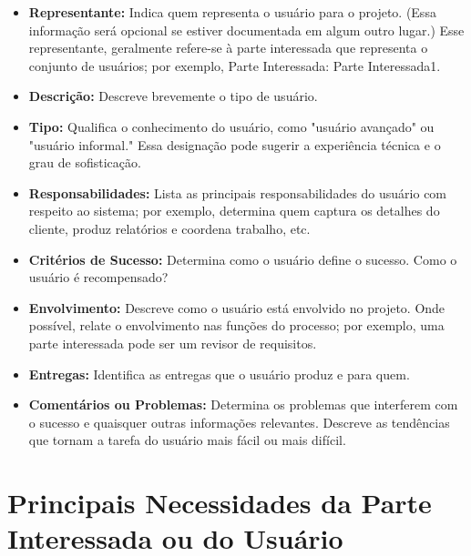 \documentclass{report}
\begin{document}
\begin{itemize}

	\item
	      \textbf{Representante:} Indica quem representa o usuário para o projeto. (Essa
	      informação será opcional se estiver documentada em algum outro lugar.) Esse
	      representante, geralmente refere-se à parte interessada que representa o
	      conjunto de usuários; por exemplo, Parte Interessada: Parte Interessada1.

	\item
	      \textbf{Descrição:} Descreve brevemente o tipo de usuário.

	\item
	      \textbf{Tipo:} Qualifica o conhecimento do usuário, como "usuário
	      avançado" ou "usuário informal." Essa designação pode sugerir a experiência
	      técnica e o grau de sofisticação.

	\item
	      \textbf{Responsabilidades:} Lista as principais responsabilidades do usuário com
	      respeito ao sistema; por exemplo, determina quem captura os detalhes do
	      cliente, produz relatórios e coordena trabalho, etc.

	\item
	      \textbf{Critérios de Sucesso:} Determina como o usuário define o sucesso. Como o
	      usuário é recompensado?

	\item
	      \textbf{Envolvimento:} Descreve como o usuário está envolvido no projeto. Onde
	      possível, relate o envolvimento nas funções do processo; por exemplo, uma parte
	      interessada pode ser um revisor de requisitos.

	\item
	      \textbf{Entregas:} Identifica as entregas que o usuário produz e para quem.

	\item
	      \textbf{Comentários ou Problemas:} Determina os problemas que interferem com o sucesso e
	      quaisquer outras informações relevantes. Descreve as tendências que tornam a
	      tarefa do usuário mais fácil ou mais difícil.

\end{itemize}

\section{Principais Necessidades da Parte Interessada ou do Usuário}
\end{document}
